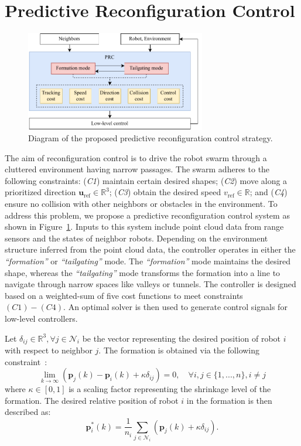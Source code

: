 \section{Predictive Reconfiguration Control}\label{sec:propose}

\begin{figure}
    \centering
    \includegraphics[width=0.7\textwidth]{paper3/images/diagram.pdf}
    \caption{Diagram of the proposed predictive reconfiguration control strategy.}
    \label{fig:diagram}
\end{figure}

The aim of reconfiguration control is to drive the robot swarm through a cluttered environment having narrow passages. The swarm adheres to the following constraints: (\textit{C1}) maintain certain desired shapes; (\textit{C2}) move along a prioritized direction $\mathbf{u}_\text{ref}\in\mathbb{R}^{3}$; (\textit{C3}) obtain the desired speed $v_\text{ref}\in\mathbb{R}$; and (\textit{C4}) ensure no collision with other neighbors or obstacles in the environment. To address this problem, we propose a predictive reconfiguration control system as shown in Figure~\ref{fig:diagram}. Inputs to this system include point cloud data from range sensors and the states of neighbor robots. Depending on the environment structure inferred from the point cloud data, the controller operates in either the \textit{``formation''} or \textit{``tailgating''} mode. The \textit{``formation''} mode maintains the desired shape, whereas the \textit{``tailgating''} mode transforms the formation into a line to navigate through narrow spaces like valleys or tunnels. The controller is designed based on a weighted-sum of five cost functions to meet constraints $(C1)-(C4)$. An optimal solver is then used to generate control signals for low-level controllers.

Let $\delta_{ij}\in\mathbb{R}^3,\forall j\in \mathcal{N}_i$ be the vector representing the desired position of robot $i$ with respect to neighbor $j$. The formation is obtained via the following constraint~\cite{Dong2016,6798711}:
\begin{equation}
    \lim_{k\to\infty}{\left(\mathbf{p}_j(k)-\mathbf{p}_i(k)+\kappa\delta_{ij}\right)}=0,\quad\forall i,j\in\{1,...,n\}, i\neq j
\end{equation}
where $\kappa\in[0,1]$ is a scaling factor representing the shrinkage level of the formation. The desired relative position of robot $i$ in the formation is then described as:
\begin{equation}
    \mathbf{p}^*_i(k)=\dfrac{1}{n_i}\sum_{j\in\mathcal{N}_i}{\left(\mathbf{p}_j\left(k\right)+\kappa\delta_{ij}\right)}.
    \label{eqn:formation}
\end{equation}

